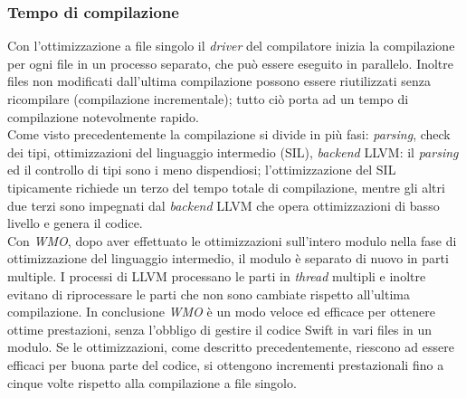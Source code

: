 \subsubsection{Tempo di compilazione}
Con l'ottimizzazione a file singolo il \textit{driver} del compilatore inizia la compilazione per ogni file in un processo separato, che può essere eseguito in parallelo. Inoltre files non modificati dall'ultima compilazione possono essere riutilizzati senza ricompilare (compilazione incrementale); tutto ciò porta ad un tempo di compilazione notevolmente rapido.\\
Come visto precedentemente la compilazione si divide in più fasi: \textit{parsing}, check dei tipi, ottimizzazioni del linguaggio intermedio (SIL), \textit{backend} LLVM: il \textit{parsing} ed il controllo di tipi sono i meno dispendiosi; l'ottimizzazione del SIL tipicamente richiede un terzo del tempo totale di compilazione, mentre gli altri due terzi sono impegnati dal \textit{backend} LLVM che opera ottimizzazioni di basso livello e genera il codice.\\
Con \textit{WMO}, dopo aver effettuato le ottimizzazioni sull'intero modulo nella fase di ottimizzazione del linguaggio intermedio, il modulo è separato di nuovo in parti multiple. I processi di LLVM processano le parti in \textit{thread} multipli e inoltre evitano di riprocessare le parti che non sono cambiate rispetto all'ultima compilazione.
In conclusione \textit{WMO} è un modo veloce ed efficace per ottenere ottime prestazioni, senza l'obbligo di gestire il codice Swift in vari files in un modulo. Se le ottimizzazioni, come descritto precedentemente, riescono ad essere efficaci per buona parte del codice, si ottengono incrementi prestazionali fino a cinque volte rispetto alla compilazione a file singolo. 
